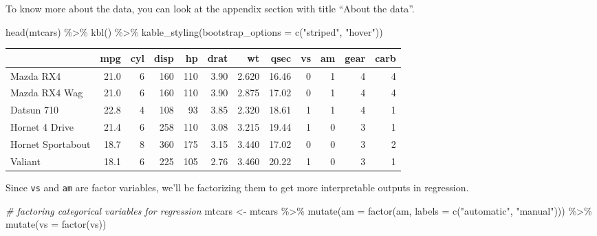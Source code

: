 \documentclass[
]{article}
\newenvironment{Shaded}{\begin{snugshade}}{\end{snugshade}}
\newcommand{\AttributeTok}[1]{\textcolor[rgb]{0.77,0.63,0.00}{#1}}
\newcommand{\CommentTok}[1]{\textcolor[rgb]{0.56,0.35,0.01}{\textit{#1}}}
\newcommand{\FunctionTok}[1]{\textcolor[rgb]{0.00,0.00,0.00}{#1}}
\newcommand{\NormalTok}[1]{#1}
\newcommand{\OtherTok}[1]{\textcolor[rgb]{0.56,0.35,0.01}{#1}}
\newcommand{\SpecialCharTok}[1]{\textcolor[rgb]{0.00,0.00,0.00}{#1}}
\newcommand{\StringTok}[1]{\textcolor[rgb]{0.31,0.60,0.02}{#1}}
\begin{document}
To know more about the data, you can look at the appendix section with
title ``About the data''.

\begin{Shaded}
\begin{Highlighting}[]
\FunctionTok{head}\NormalTok{(mtcars) }\SpecialCharTok{\%\textgreater{}\%}
  \FunctionTok{kbl}\NormalTok{() }\SpecialCharTok{\%\textgreater{}\%}
  \FunctionTok{kable\_styling}\NormalTok{(}\AttributeTok{bootstrap\_options =} \FunctionTok{c}\NormalTok{(}\StringTok{"striped"}\NormalTok{, }\StringTok{"hover"}\NormalTok{))}
\end{Highlighting}
\end{Shaded}

\begin{table}
\centering
\begin{tabular}[t]{l|r|r|r|r|r|r|r|r|r|r|r}
\hline
  & mpg & cyl & disp & hp & drat & wt & qsec & vs & am & gear & carb\\
\hline
Mazda RX4 & 21.0 & 6 & 160 & 110 & 3.90 & 2.620 & 16.46 & 0 & 1 & 4 & 4\\
\hline
Mazda RX4 Wag & 21.0 & 6 & 160 & 110 & 3.90 & 2.875 & 17.02 & 0 & 1 & 4 & 4\\
\hline
Datsun 710 & 22.8 & 4 & 108 & 93 & 3.85 & 2.320 & 18.61 & 1 & 1 & 4 & 1\\
\hline
Hornet 4 Drive & 21.4 & 6 & 258 & 110 & 3.08 & 3.215 & 19.44 & 1 & 0 & 3 & 1\\
\hline
Hornet Sportabout & 18.7 & 8 & 360 & 175 & 3.15 & 3.440 & 17.02 & 0 & 0 & 3 & 2\\
\hline
Valiant & 18.1 & 6 & 225 & 105 & 2.76 & 3.460 & 20.22 & 1 & 0 & 3 & 1\\
\hline
\end{tabular}
\end{table}

Since \texttt{vs} and \texttt{am} are factor variables, we'll be
factorizing them to get more interpretable outputs in regression.

\begin{Shaded}
\begin{Highlighting}[]
\CommentTok{\# factoring categorical variables for regression}
\NormalTok{mtcars }\OtherTok{\textless{}{-}}\NormalTok{ mtcars }\SpecialCharTok{\%\textgreater{}\%}
    \FunctionTok{mutate}\NormalTok{(}\AttributeTok{am =} \FunctionTok{factor}\NormalTok{(am, }\AttributeTok{labels =} \FunctionTok{c}\NormalTok{(}\StringTok{"automatic"}\NormalTok{, }\StringTok{"manual"}\NormalTok{))) }\SpecialCharTok{\%\textgreater{}\%}
    \FunctionTok{mutate}\NormalTok{(}\AttributeTok{vs =} \FunctionTok{factor}\NormalTok{(vs))}
\end{Highlighting}
\end{Shaded}
\end{document}
